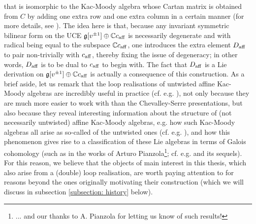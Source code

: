         that is isomorphic to the Kac-Moody algebra whose Cartan matrix is obtained from $C$ by adding one extra row and one extra column in a certain manner (for more details, see \cite[Chapter 7]{kac_infinite_dimensional_lie_algebras}). The idea here is that, because any invariant symmetric bilinear form on the UCE $\mathfrak{g}[v^{\pm 1}] \oplus \mathbb{C} c_{\mathrm{aff}}$ is necessarily degenerate and with radical being equal to the subspace $\mathbb{C} c_{\mathrm{aff}}$, one introduces the extra element $D_{\mathrm{aff}}$ to pair non-trivially with $c_{\mathrm{aff}}$, thereby fixing the issue of degeneracy; in other words, $D_{\mathrm{aff}}$ is to be dual to $c_{\mathrm{aff}}$ to begin with. The fact that $D_{\mathrm{aff}}$ is a Lie derivation on $\mathfrak{g}[v^{\pm 1}] \oplus \mathbb{C} c_{\mathrm{aff}}$ is actually a consequence of this construction. As a brief aside, let us remark that the loop realisations of untwisted affine Kac-Moody algebras are incredibly useful in practice (cf. e.g. \cite[Chapters 9 and 10]{kac_infinite_dimensional_lie_algebras}), not only because they are much more easier to work with than the Chevalley-Serre presentations, but also because they reveal interesting information about the structure of (not necessarily untwisted) affine Kac-Moody algebras, e.g. how such Kac-Moody algebras all arise as so-called  of the untwisted ones (cf. e.g. \cite[Chapter 8]{kac_infinite_dimensional_lie_algebras}), and how this phenomenon gives rise to a classification of these Lie algebras in terms of Galois cohomology (such as in the works of Arturo Pianzola\footnote{... and our thanks to A. Pianzola for letting us know of such results!}; cf. e.g. \cite{pianzola_vanishing_of_H1_of_dedekind_rings} and its sequels). For this reason, we believe that the objects of main interest in this thesis, which also arise from a (double) loop realisation, are worth paying attention to for reasons beyond the ones originally motivating their construction (which we will discuss in subsection \ref{subsection: history} below).


